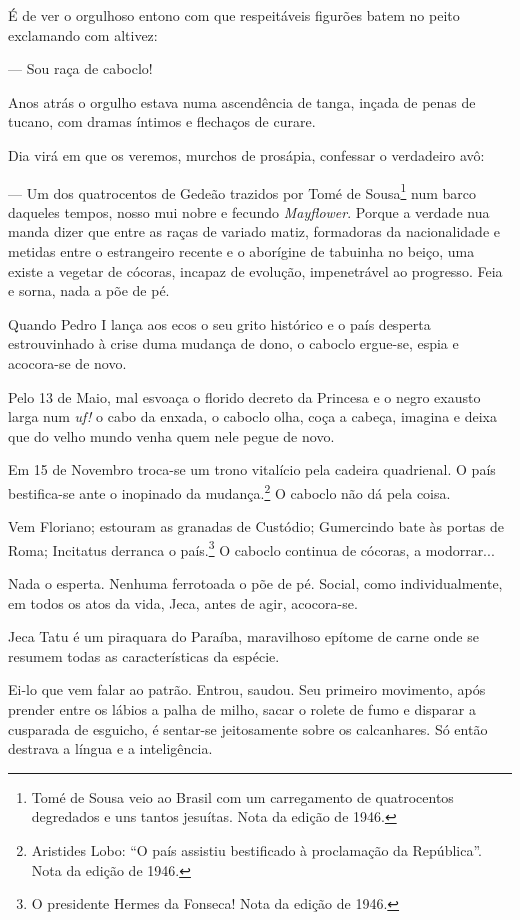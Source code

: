 É de ver o orgulhoso entono com que respeitáveis figurões batem no peito
exclamando com altivez:

--- Sou raça de caboclo!

Anos atrás o orgulho estava numa ascendência de tanga, inçada de penas
de tucano, com dramas íntimos e flechaços de curare.

Dia virá em que os veremos, murchos de prosápia, confessar o verdadeiro
avô:

--- Um dos quatrocentos de Gedeão trazidos por Tomé de Sousa\footnote{Tomé
  de Sousa veio ao Brasil com um carregamento de quatrocentos degredados
  e uns tantos jesuítas. Nota da edição de 1946.} num barco daqueles
tempos, nosso mui nobre e fecundo \emph{Mayflower}. Porque a verdade nua
manda dizer que entre as raças de variado matiz, formadoras da
nacionalidade e metidas entre o estrangeiro recente e o aborígine de
tabuinha no beiço, uma existe a vegetar de cócoras, incapaz de evolução,
impenetrável ao progresso. Feia e sorna, nada a põe de pé.

Quando Pedro I lança aos ecos o seu grito histórico e o país desperta
estrouvinhado à crise duma mudança de dono, o caboclo ergue-se, espia e
acocora-se de novo.

Pelo 13 de Maio, mal esvoaça o florido decreto da Princesa e o negro
exausto larga num \emph{uf!} o cabo da enxada, o caboclo olha, coça a
cabeça, imagina e deixa que do velho mundo venha quem nele pegue de
novo.

Em 15 de Novembro troca-se um trono vitalício pela cadeira quadrienal. O
país bestifica-se ante o inopinado da mudança.\footnote{Aristides Lobo:
  ``O país assistiu bestificado à proclamação da República''. Nota da
  edição de 1946.} O caboclo não dá pela coisa.

Vem Floriano; estouram as granadas de Custódio; Gumercindo bate às
portas de Roma; Incitatus derranca o país.\footnote{O presidente Hermes
  da Fonseca! Nota da edição de 1946.} O caboclo continua de cócoras, a
modorrar...

Nada o esperta. Nenhuma ferrotoada o põe de pé. Social, como
individualmente, em todos os atos da vida, Jeca, antes de agir,
acocora-se.

Jeca Tatu é um piraquara do Paraíba, maravilhoso epítome de carne onde
se resumem todas as características da espécie.

Ei-lo que vem falar ao patrão. Entrou, saudou. Seu primeiro movimento,
após prender entre os lábios a palha de milho, sacar o rolete de fumo e
disparar a cusparada de esguicho, é sentar-se jeitosamente sobre os
calcanhares. Só então destrava a língua e a inteligência.

